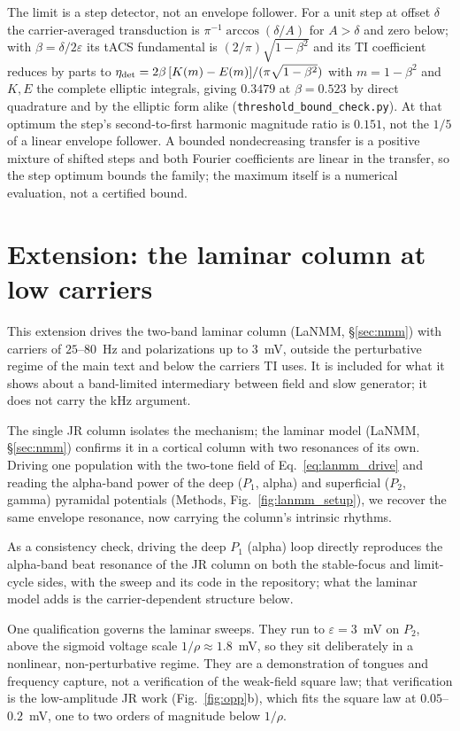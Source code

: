 \documentclass[11pt,a4paper]{article}
\begin{document}
The limit is a step detector, not an envelope follower. For a unit step at offset
$\delta$ the carrier-averaged transduction is $\pi^{-1}\arccos(\delta/A)$ for $A>\delta$
and zero below; with $\beta=\delta/2\varepsilon$ its tACS fundamental is
$(2/\pi)\sqrt{1-\beta^2}$ and its TI coefficient reduces by parts to
$\eta_{\rm det}=2\beta\,[K(m)-E(m)]/(\pi\sqrt{1-\beta^2})$ with $m=1-\beta^2$ and $K,E$
the complete elliptic integrals, giving $0.3479$ at $\beta=0.523$ by direct quadrature and
by the elliptic form alike (\texttt{threshold\_bound\_check.py}). At that optimum the
step's second-to-first harmonic magnitude ratio is $0.151$, not the $1/5$ of a linear
envelope follower. A bounded nondecreasing transfer is a positive mixture of shifted steps
and both Fourier coefficients are linear in the transfer, so the step optimum bounds the
family; the maximum itself is a numerical evaluation, not a certified bound.

\section{Extension: the laminar column at low carriers}\label{app:lanmm}
\label{sec:lanmm-results}
This extension drives the two-band laminar column (LaNMM, \S\ref{sec:nmm}) with carriers
of $25$--$80$~Hz and polarizations up to $3$~mV, outside the perturbative regime of the
main text and below the carriers TI uses. It is included for what it shows about a
band-limited intermediary between field and slow generator; it does not carry the kHz
argument.

The single JR column isolates the mechanism; the laminar model
(LaNMM, \S\ref{sec:nmm}) confirms it in a cortical column with two resonances of its
own. Driving one population with the two-tone field of Eq.~\eqref{eq:lanmm_drive}
and reading the alpha-band power of the deep ($P_1$, alpha) and superficial ($P_2$,
gamma) pyramidal potentials (Methods, Fig.~\ref{fig:lanmm_setup}), we recover the
same envelope resonance, now carrying the column's intrinsic rhythms.

As a consistency check, driving the deep $P_1$ (alpha) loop directly reproduces the
alpha-band beat resonance of the JR column on both the stable-focus and limit-cycle sides,
with the sweep and its code in the repository; what the laminar model adds is the
carrier-dependent structure below.

One qualification governs the laminar sweeps. They run to $\varepsilon=3$~mV on $P_2$,
above the sigmoid voltage scale $1/\rho\approx1.8$~mV, so they sit deliberately in a
nonlinear, non-perturbative regime. They are a demonstration of tongues and frequency
capture, not a verification of the weak-field square law; that verification is the
low-amplitude JR work (Fig.~\ref{fig:opp}b), which fits the square law at
$0.05$--$0.2$~mV, one to two orders of magnitude below $1/\rho$.
\end{document}
